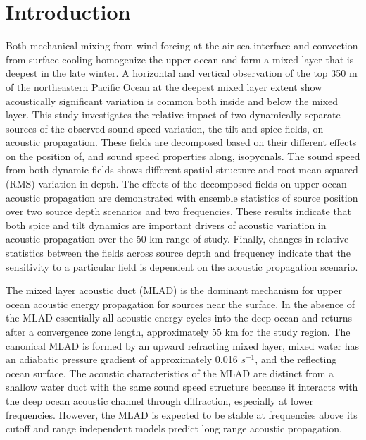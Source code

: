 \documentclass[preprint,NumberedRefs]{JASA}
\begin{document}
\section{\label{sec:intro} Introduction}
Both mechanical mixing from wind forcing at the air-sea interface and convection from surface cooling homogenize the upper ocean and form a mixed layer that is deepest in the late winter\citep{cole2010seasonal}. A horizontal and vertical observation of the top 350 m of the northeastern Pacific Ocean at the deepest mixed layer extent show acoustically significant variation is common both inside and below the mixed layer\citep{colosi2020observations}. This study investigates the relative impact of two dynamically separate sources of the observed sound speed variation, the tilt and spice fields, on acoustic propagation. These fields are decomposed based on their different effects on the position of, and sound speed properties along, isopycnals\cite{dzieciuch2004}. The sound speed from both dynamic fields shows different spatial structure and root mean squared (RMS) variation in depth. The effects of the decomposed fields on upper ocean acoustic propagation are demonstrated with ensemble statistics of source position over two source depth scenarios and two frequencies. These results indicate that both spice and tilt dynamics are important drivers of acoustic variation in acoustic propagation over the 50 km range of study. Finally, changes in relative statistics between the fields across source depth and frequency indicate that the sensitivity to a particular field is dependent on the acoustic propagation scenario.

The mixed layer acoustic duct (MLAD) is the dominant mechanism for upper ocean acoustic energy propagation for sources near the surface. In the absence of the MLAD essentially all acoustic energy cycles into the deep ocean and returns after a convergence zone length\cite{jensen2011computational}, approximately 55 km for the study region. The canonical MLAD is formed by an upward refracting mixed layer, mixed water has an adiabatic pressure gradient of approximately 0.016 $s^{-1}$, and the reflecting ocean surface. The acoustic characteristics of the MLAD are distinct from a shallow water duct with the same sound speed structure because it interacts with the deep ocean acoustic channel through diffraction\citep{porter93}, especially at lower frequencies. However, the MLAD is expected to be stable at frequencies above its cutoff\citep{Urick1982Prop} and range independent models predict long range acoustic propagation.
\end{document}
